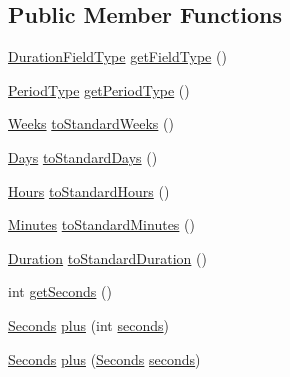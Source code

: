 \subsection*{Public Member Functions}
\begin{DoxyCompactItemize}
\item 
\hyperlink{classorg_1_1joda_1_1time_1_1_duration_field_type}{Duration\-Field\-Type} \hyperlink{classorg_1_1joda_1_1time_1_1_seconds_a3013d38a16f4a27d4bd8bdc61cc8dfce}{get\-Field\-Type} ()
\item 
\hyperlink{classorg_1_1joda_1_1time_1_1_period_type}{Period\-Type} \hyperlink{classorg_1_1joda_1_1time_1_1_seconds_a61dcd22e6005f812628c88b05e3fac36}{get\-Period\-Type} ()
\item 
\hyperlink{classorg_1_1joda_1_1time_1_1_weeks}{Weeks} \hyperlink{classorg_1_1joda_1_1time_1_1_seconds_a9294b0b88bd91703cbc069251ae3b392}{to\-Standard\-Weeks} ()
\item 
\hyperlink{classorg_1_1joda_1_1time_1_1_days}{Days} \hyperlink{classorg_1_1joda_1_1time_1_1_seconds_a8d8f55e78d7223d33c201e00bbacb4ba}{to\-Standard\-Days} ()
\item 
\hyperlink{classorg_1_1joda_1_1time_1_1_hours}{Hours} \hyperlink{classorg_1_1joda_1_1time_1_1_seconds_a70b42ba28fa8241e3cc5aa3cdf19fa5e}{to\-Standard\-Hours} ()
\item 
\hyperlink{classorg_1_1joda_1_1time_1_1_minutes}{Minutes} \hyperlink{classorg_1_1joda_1_1time_1_1_seconds_a8fea253f7cc876c0700a05f9ad742e9a}{to\-Standard\-Minutes} ()
\item 
\hyperlink{classorg_1_1joda_1_1time_1_1_duration}{Duration} \hyperlink{classorg_1_1joda_1_1time_1_1_seconds_adb38df787a9c9d45707a39aa41bc6679}{to\-Standard\-Duration} ()
\item 
int \hyperlink{classorg_1_1joda_1_1time_1_1_seconds_afdbf79be3a86ac1dc79a0ecf5fb56326}{get\-Seconds} ()
\item 
\hyperlink{classorg_1_1joda_1_1time_1_1_seconds}{Seconds} \hyperlink{classorg_1_1joda_1_1time_1_1_seconds_afc3766cd6194ea53d51aa7eec3b4bcde}{plus} (int \hyperlink{classorg_1_1joda_1_1time_1_1_seconds_a01dac82028b4db26726a52a4c15783cf}{seconds})
\item 
\hyperlink{classorg_1_1joda_1_1time_1_1_seconds}{Seconds} \hyperlink{classorg_1_1joda_1_1time_1_1_seconds_a03a75f9f7f796c9cfd075b21adb1c6ed}{plus} (\hyperlink{classorg_1_1joda_1_1time_1_1_seconds}{Seconds} \hyperlink{classorg_1_1joda_1_1time_1_1_seconds_a01dac82028b4db26726a52a4c15783cf}{seconds})
\item 

\end{DoxyCompactItemize}
